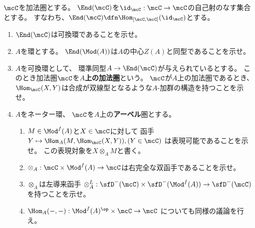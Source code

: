 \documentclass[uplatex,dvipdfmx]{jsarticle}
\begin{document}
\maketitle\HeaderCommentA
\section{}
\fi


\begin{prob}\label{1.37}
  \(\mcC\)を加法圏とする。
  \(\End(\mcC)\)を\(\id_{\mcC}:\mcC\to \mcC\)の自己射のなす集合とする。
  すなわち、\(\End(\mcC) \dfn \Hom_{[\mcC,\mcC]}(\id_{\mcC})\)とする。
  \begin{enumerate}
    \item \label{1.37.1}
    \(\End(\mcC)\)は可換環であることを示せ。
    \item \label{1.37.2}
    \(A\)を環とする。
    \(\End(\Mod(A))\)は\(A\)の中心\(Z(A)\)と同型であることを示せ。
    \item \label{1.37.3}
    \(A\)を可換環として、
    環準同型\(A\to \End(\mcC)\)が与えられているとする。
    このとき加法圏\(\mcC\)を\textbf{\(A\)上の加法圏}という。
    \(\mcC\)が\(A\)上の加法圏であるとき、
    \(\Hom_{\mcC}(X,Y)\)は合成が双線型となるような\(A\)-加群の構造を持つことを示せ。
    \item \label{1.37.4}
    \(A\)をネーター環、
    \(\mcC\)を\(A\)上の\textbf{アーベル}圏とする。
    \begin{enumerate}
      \item \label{1.37.4.1}
      \(M\in \Mod^f(A)\)と\(X\in \mcC\)に対して
      函手\(Y\mapsto \Hom_A(M,\Hom_{\mcC}(X,Y)), (Y\in \mcC)\)
      は表現可能であることを示せ。
      この表現対象を\(X\otimes_A M\)と書く。
      \item \label{1.37.4.2}
      \(\otimes_A:\mcC\times\Mod^f(A)\to \mcC\)は右完全な双函手であることを示せ。
      \item \label{1.37.4.3}
      \(\otimes_A\)は左導来函手
      \(\otimes_A^L:\sfD^-(\mcC)\times \sfD^-(\Mod^f(A))\to \sfD^-(\mcC)\)
      を持つことを示せ。
      \item \label{1.37.4.4}
      \(\Hom_A(-,-):\Mod^f(A)^{\op}\times \mcC\to \mcC\)
      についても同様の議論を行え。
    \end{enumerate}
  \end{enumerate}
\end{prob}
\end{document}
